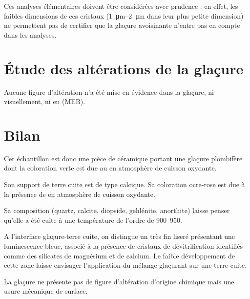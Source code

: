 Ces analyses élémentaires doivent être considérées avec prudence : 
en effet, les faibles dimensions de ces cristaux 
(\SIrange[range-phrase=\ à\ ]{1}{2}{\um} dans leur plus petite 
dimension) ne permettent pas de certifier que la glaçure avoisinante 
n'entre pas en compte dans les analyses.


\section{Étude des altérations de la glaçure}

Aucune figure d'altération n'a été mise en évidence dans la glaçure, 
ni visuellement, ni en \MEB[ie] (MEB).


\section{Bilan}

Cet échantillon est donc une pièce de céramique portant une 
glaçure plombifère dont la coloration verte est due au  
en atmosphère de cuisson oxydante.

Son support de terre cuite est de type calcique. Sa coloration 
ocre-rose est due à la présence de  en atmosphère de 
cuisson oxydante.

Sa composition \cristallo (quartz, calcite, diopside, 
gehlénite, anorthite) laisse penser qu'elle a été cuite à une 
température de l'ordre de 
\SIrange[range-phrase=\ à\ ]{900}{950}{\degC}.

A l'interface glaçure-terre cuite, on distingue un très fin liseré 
présentant une luminescence bleue, associé à la présence de cristaux 
de dévitrification identifiés comme des silicates de magnésium et de 
calcium. Le faible développement de cette zone laisse envisager 
l'application du mélange glaçurant sur une terre cuite.

La glaçure ne présente pas de figure d'altération d'origine chimique 
mais une usure mécanique de surface.
